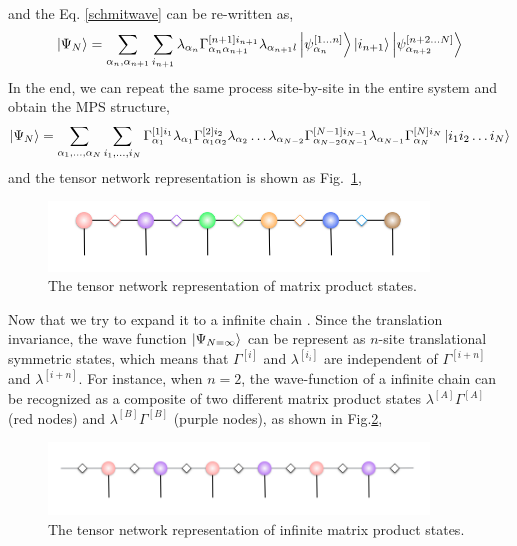 and the Eq. \ref{schmitwave} can be re-written as, 
\begin{align}
	\Ket{\Psi_{N}} = \sum_{\alpha_n,\alpha_{n+1}}\sum_{i_{n+1}}{\lambda_{\alpha_n} \Gamma^{[n+1] i_{n+1}}_{\alpha_n \alpha_{n+1}} \lambda_{\alpha_{n+1}l} \Ket{\psi_{\alpha_n}^{[1\dots n]}} \Ket{i_{n+1}} \Ket{\psi_{\alpha_{n+2}}^{[n+2\dots N]}} }
\end{align}
In the end, we can repeat the same process site-by-site in the entire system and obtain the MPS structure,
\begin{align}
	\Ket{\Psi_N} = \sum_{\alpha_1,\dots ,\alpha_N}\sum_{i_1,\dots ,i_N}{ \Gamma^{[1] i_{1}}_{\alpha_1} \lambda_{\alpha_1} \Gamma^{[2] i_{2}}_{\alpha_1 \alpha_{2}} \lambda_{\alpha_2} \dots  \lambda_{\alpha_{N-2}} \Gamma^{[N-1] i_{N-1}}_{\alpha_{N-2} \alpha_{N-1}} \lambda_{\alpha_{N-1}} \Gamma^{[N] i_{N}}_{\alpha_{N}} \Ket{i_1 i_2 \dots i_N}}
\end{align}
and the tensor network representation is shown as Fig.~\ref{fig311}, 
\begin{figure}[ht]
	\centering
	\includegraphics[width=0.90\textwidth]{figures/fig3111.png}
	\caption[The tensor network representation of matrix product states]{The tensor network representation of matrix product states.}
	\label{fig311}
\end{figure}

Now that we try to expand it to a infinite chain \cite{PhysRevLett.98.070201}. Since the translation invariance, the wave function $\Ket{\Psi_{N=\infty}}$ can be represent as $n$-site translational symmetric states, which means that $\Gamma^{[i]}$ and $\lambda^{[i_{i}]}$ are independent of $\Gamma^{[i+n]}$ and $\lambda^{[i+n]}$. For instance, when $n=2$, the wave-function of a infinite chain can be recognized as a composite of two different matrix product states $\lambda^{[A]}\Gamma^{[A]}$ (red nodes) and $\lambda^{[B]}\Gamma^{[B]}$ (purple nodes), as shown in Fig.\ref{fig312}, 

\begin{figure}[ht]
	\centering
	\includegraphics[width=0.90\textwidth]{figures/fig311.png}
	\caption[The tensor network representation of infinite matrix product states]{The tensor network representation of infinite matrix product states.}
	\label{fig312}
\end{figure}

